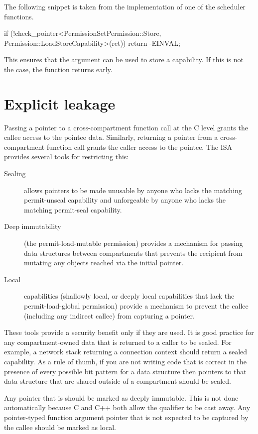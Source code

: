 The following snippet is taken from the implementation of one of the scheduler functions.

\begin{ccodelisting}
if (!check_pointer<PermissionSet{Permission::Store,
                                 Permission::LoadStoreCapability}>(ret))
{
    return -EINVAL;
}
\end{ccodelisting}

This ensures that the  argument can be used to store a capability.
If this is not the case, the function returns early.

\section{Explicit leakage}

Passing a pointer to a cross-compartment function call at the C level grants the callee access to the pointee data.
Similarly, returning a pointer from a cross-compartment function call grants the caller access to the pointee.
The ISA provides several tools for restricting this:

\begin{description}
	\item[Sealing] allows pointers to be made unusable by anyone who lacks the matching permit-unseal capability and unforgeable by anyone who lacks the matching permit-seal capability.
	\item[Deep immutability] (the permit-load-mutable permission) provides a mechanism for passing data structures between compartments that prevents the recipient from mutating any objects reached via the initial pointer.
	\item[Local] capabilities (shallowly local, or deeply local capabilities that lack the permit-load-global permission) provide a mechanism to prevent the callee (including any indirect callee) from capturing a pointer.
\end{description}

These tools provide a security benefit only if they are used.
It is good practice for any compartment-owned data that is returned to a caller to be sealed.
For example, a network stack returning a connection context should return a sealed capability.
As a rule of thumb, if you are not writing code that is correct in the presence of every possible bit pattern for a data structure then pointers to that data structure that are shared outside of a compartment should be sealed.

Any pointer that is  should be marked as deeply immutable.
This is not done automatically because C and C++ both allow the  qualifier to be cast away.
Any pointer-typed function argument pointer that is not expected to be captured by the callee should be marked as local.

